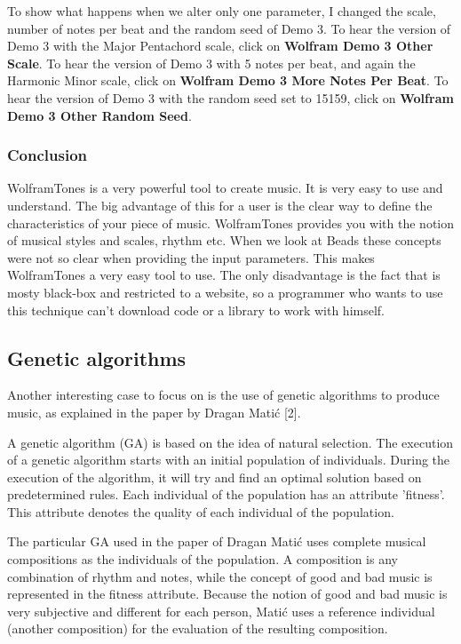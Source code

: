 \documentclass[12pt]{article}
\begin{document}
To show what happens when we alter only one parameter, I changed the scale, number of notes per beat and the random seed of Demo 3. To hear the version of Demo 3 with the Major Pentachord scale, click on \textbf{Wolfram Demo 3 Other Scale}. To hear the version of Demo 3 with 5 notes per beat, and again the Harmonic Minor scale, click on \textbf{Wolfram Demo 3 More Notes Per Beat}. To hear the version of Demo 3 with the random seed set to 15159, click on \textbf{Wolfram Demo 3 Other Random Seed}.

\subsubsection{Conclusion}

WolframTones is a very powerful tool to create music. It is very easy to use and understand. The big advantage of this for a user is the clear way to define the characteristics of your piece of music. WolframTones provides you with the notion of musical styles and scales, rhythm etc. When we look at Beads these concepts were not so clear when providing the input parameters. This makes WolframTones a very easy tool to use. The only disadvantage is the fact that is mosty black-box and restricted to a website, so a programmer who wants to use this technique can't download code or a library to work with himself.

\subsection{Genetic algorithms}

Another interesting case to focus on is the use of genetic algorithms to produce music, as explained in the paper by Dragan Mati\'c [2].
\newline

A genetic algorithm (GA) is based on the idea of natural selection. The execution of a genetic algorithm starts with an initial population of individuals. During the execution of the algorithm, it will try and find an optimal solution based on predetermined rules. Each individual of the population has an attribute 'fitness'. This attribute denotes the quality of each individual of the population.
\newline

The particular GA used in the paper of Dragan Mati\'c uses complete musical compositions as the individuals of the population. A composition is any combination of rhythm and notes, while the concept of good and bad music is represented in the fitness attribute. Because the notion of good and bad music is very subjective and different for each person, Mati\'c uses a reference individual (another composition) for the evaluation of the resulting composition.
\newline
\end{document}

